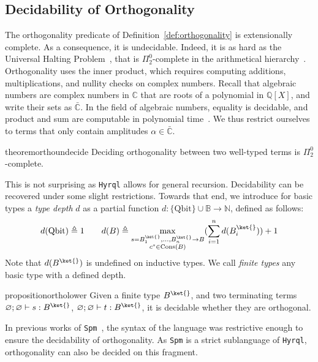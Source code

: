 \documentclass[10pt,a4paper]{article}
\newcommand{\bvar}{B}
\newcommand\bkvar{\bvar^{\ket{}}}
\newcommand{\qbit}{\mathrm{Qbit}}
\newcommand{\bset}{\mathbb{B}}
\newcommand{\cons}[1]{\mathrm{Cons}(#1)}
\newcommand{\sign}[2]{\ifx&#1&
  \else
  #1 \to
  \fi
#2}
\newcommand{\typing}[4]{
  \ifx&#1&\varnothing \else #1\fi; 
  \ifx&#2&\varnothing \else #2\fi 
  \vdash {#3} : #4
}
\newcommand{\closedtyping}[2]{\typing{}{}{#1}{#2}}
\newcommand{\pitwo}{\Pi_2^0}
\newcommand{\hyrql}{{{\tt{Hyrql}}}}
\newcommand{\spm}{{{\tt{Spm}}}}
\begin{document}
\subsection{Decidability of Orthogonality}
\label{subsec:orthogonality}
The orthogonality predicate of Definition~\ref{def:orthogonality} is
extensionally complete. As a consequence, it is undecidable.
Indeed, it is as hard as the Universal Halting Problem~\cite{EGZ09}, that is
$\Pi^0_2$-complete in the arithmetical hierarchy~\cite{Nie09}.
Orthogonality uses the inner product, which requires computing
additions, multiplications, and nullity checks on complex numbers. Recall that
algebraic numbers are complex numbers in $\mathbb C$ that are roots of a
polynomial in $\mathbb Q[X]$, and write their sets as $\bar{\mathbb C}$. In the
field of algebraic numbers, equality is decidable, and product and sum are
computable in polynomial time~\cite{HHK05}. We thus restrict ourselves to terms
that only contain amplitudes $\alpha \in \bar{\mathbb C}$.


\begin{restatable}{theorem}{orthoundecide}
  \label{thm:orthogonality-undecidable}
  Deciding orthogonality between two well-typed terms is $\pitwo$-complete.
\end{restatable}


This is not surprising as \hyrql{} allows for
general recursion. Decidability can be recovered under some slight restrictions.
Towards that end, we introduce for basic types
a \emph{type depth} $d$ as a partial function $d: \{\qbit \}\cup\bset \to
\mathbb N $, defined as follows:
\[
  d(\qbit) \triangleq 1 \qquad
  d(B) \triangleq \max_{\substack{{ s = \sign{\bkvar_1, \dots, \bkvar_n}
  \bvar} \\ c^s \in \cons B}}
  (\sum_{i=1}^n d(\bkvar_i)) + 1
\]
Note that $d(\bkvar)$ is undefined on inductive types.
We call \emph{finite types} any basic type with a defined depth.

\begin{restatable}{proposition}{ortholower}
  \label{prop:orthogonality-lower}
  Given a finite type $\bkvar$, and two terminating terms $\closedtyping s
  \bkvar$, $\closedtyping t \bkvar$, it is decidable whether they are
  orthogonal.
\end{restatable}

In previous works of \spm~\cite{CSV23, CLV24},
the syntax of the language was restrictive enough to ensure the decidability of
orthogonality. As \spm{} is a strict sublanguage of {\hyrql}, orthogonality
can also be decided on this fragment.
\end{document}
